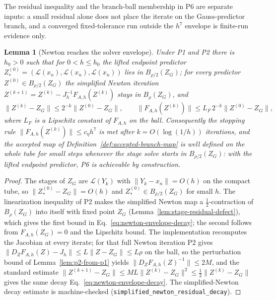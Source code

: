 \documentclass[preprint,12pt]{elsarticle}
\newtheorem{lemma}{Lemma}
\begin{document}
The residual inequality and the branch-ball membership in P6 are separate
inputs: a small residual alone does not place the iterate on the
Gauss-predictor branch, and a converged fixed-tolerance run outside the
$h^7$ envelope is finite-run evidence only.

\begin{lemma}[Newton reaches the solver envelope]
\label{lem:newton-envelope}
Under P1 and P2 there is $h_0>0$ such that for $0<h\le h_0$ the lifted
endpoint predictor
$Z^{(0)}_\ast=(\mathcal L(x_n),\mathcal L(x_n),\mathcal L(x_n))$ lies in
$B_{\rho/2}(Z_G)$; for every predictor $Z^{(0)}\in B_{\rho/2}(Z_G)$ the
simplified Newton iteration $Z^{(k+1)}=Z^{(k)}-J_h^{-1}F_{A,h}(Z^{(k)})$ stays
in $B_\rho(Z_G)$, and
\begin{equation}
  \|Z^{(k)}-Z_G\|\le 2^{-k}\|Z^{(0)}-Z_G\|,\qquad
  \|F_{A,h}(Z^{(k)})\|\le L_F\,2^{-k}\|Z^{(0)}-Z_G\| ,
  \label{eq:newton-envelope-decay}
\end{equation}
where $L_F$ is a Lipschitz constant of $F_{A,h}$ on the ball. Consequently
the stopping rule $\|F_{A,h}(Z^{(k)})\|\le c_\eta h^7$ is met after
$k=O(\log(1/h))$ iterations, and the accepted map of
Definition~\ref{def:accepted-branch-map} is well defined on the whole tube
for small steps whenever the stage solve starts in $B_{\rho/2}(Z_G)$: with
the lifted endpoint predictor, P6 is achievable by construction.
\end{lemma}

\begin{proof}
The stages of $Z_G$ are $\mathcal L(Y_k)$ with $\|Y_k-x_n\|=O(h)$ on the
compact tube, so $\|Z^{(0)}_\ast-Z_G\|=O(h)$ and $Z^{(0)}_\ast\in B_{\rho/2}(Z_G)$
for small $h$. The linearization inequality of P2 makes the simplified Newton
map a $\tfrac12$-contraction of $B_\rho(Z_G)$ into itself with fixed point
$Z_G$ (Lemma~\ref{lem:stage-residual-defect}), which gives the first bound in
Eq.~\eqref{eq:newton-envelope-decay}; the second follows from
$F_{A,h}(Z_G)=0$ and the Lipschitz bound. The implementation recomputes the
Jacobian at every iterate; for that full Newton iteration P2 gives
$\|D_ZF_{A,h}(Z)-J_h\|\le L\|Z-Z_G\|\le L\rho$ on the ball, so the
perturbation bound of Lemma~\ref{lem:p2-from-p1} yields
$\|D_ZF_{A,h}(Z)^{-1}\|\le 2M$, and the standard estimate
$\|Z^{(k+1)}-Z_G\|\le ML\|Z^{(k)}-Z_G\|^2\le\tfrac12\|Z^{(k)}-Z_G\|$ gives the
same decay Eq.~\eqref{eq:newton-envelope-decay}. The simplified-Newton decay
estimate is machine-checked (\texttt{simplified\_newton\_residual\_decay}).
\end{proof}
\end{document}
